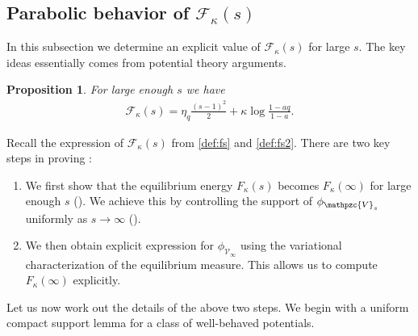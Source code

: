 \documentclass[reqno,11pt]{amsart}
\newcommand{\logq}{\eta_q}
\numberwithin{equation}{section}
\newtheorem{proposition}{Proposition}[section]
\theoremstyle{definition}
\begin{document}
\subsection{Parabolic behavior of $\mathcal{F}_\kappa(s)$} \label{sec.2.2} In this subsection we determine an explicit value of $\mathcal{F}_\kappa(s)$ for large $s$. The key ideas essentially comes from potential theory arguments.

\begin{proposition} \label{p.energystab} For large enough $s$ we have 
\begin{align}\label{f.para}
    \mathcal{F}_\kappa(s)=\logq \frac{(s-1)^2}{2}+\kappa \log \frac{1-aq}{1-a}.
\end{align}
\end{proposition}

Recall the expression of $\mathcal{F}_\kappa(s)$ from \eqref{def:fs} and \eqref{def:fs2}. There are two key steps in proving :
\begin{enumerate}[label=(\Alph*),leftmargin=18pt]
    \item \label{1ststep} We first show that the equilibrium energy $F_\kappa(s)$ becomes $F_\kappa(\infty)$ for large enough $s$ (). We achieve this by controlling the support of $\phi_{\mathpzc{V}_s}$ uniformly as $s\to \infty$ (). 
    \item \label{2ndstep} We then obtain explicit expression for $\phi_{\mathcal{V}_\infty}$ using the variational characterization of the equilibrium measure. This allows us to compute $F_\kappa(\infty)$ explicitly.
\end{enumerate}
     
Let us now work out the details of the above two steps. We begin with a uniform compact support lemma for a class of well-behaved potentials.
\end{document}
